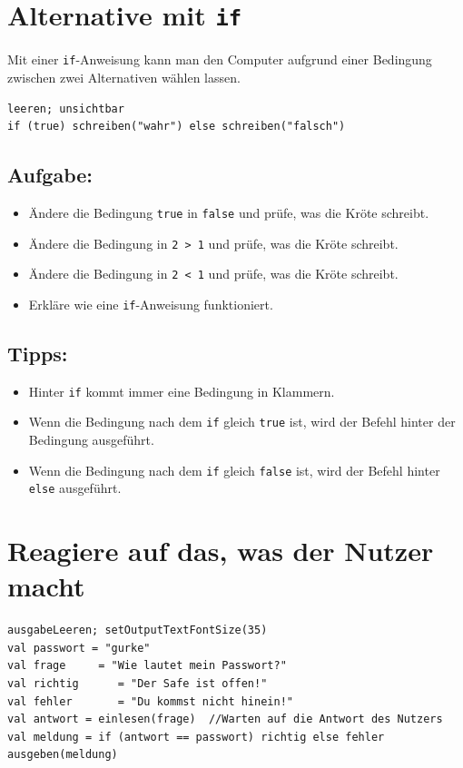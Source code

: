 \chapter{Alternative mit \lstinline{if}}Mit einer \lstinline{if}-Anweisung kann man den Computer aufgrund einer Bedingung zwischen zwei Alternativen wählen lassen.

\begin{lstlisting}[basicstyle={\ttfamily\fontsize{20}{24}\selectfont},numbers=none]
leeren; unsichtbar
if (true) schreiben("wahr") else schreiben("falsch")
\end{lstlisting}
        
\section*{\color{BrickRed}Aufgabe:}


\begin{itemize}

\item {Ändere die Bedingung \lstinline{true} in \lstinline{false} und prüfe, was die Kröte schreibt.}
\item {Ändere die Bedingung in \lstinline{2 > 1} und prüfe, was die Kröte schreibt.}
\item {Ändere die Bedingung in \lstinline{2 < 1} und prüfe, was die Kröte schreibt.}
\item {Erkläre wie eine \lstinline{if}-Anweisung funktioniert.}

\end{itemize}


\section*{\color{OliveGreen}Tipps:}


\begin{itemize}

\item {Hinter \lstinline{if} kommt immer eine Bedingung in Klammern.}
\item {Wenn die Bedingung nach dem \lstinline{if} gleich \lstinline{true} ist, wird der Befehl hinter der Bedingung ausgeführt.}
\item {Wenn die Bedingung nach dem \lstinline{if} gleich \lstinline{false} ist, wird der Befehl hinter \lstinline{else} ausgeführt.}

\end{itemize}


\chapter{Reagiere auf das, was der Nutzer macht}
\begin{lstlisting}[basicstyle={\ttfamily\fontsize{20}{24}\selectfont},numbers=none]
ausgabeLeeren; setOutputTextFontSize(35)
val passwort = "gurke"
val frage     = "Wie lautet mein Passwort?"
val richtig      = "Der Safe ist offen!"
val fehler       = "Du kommst nicht hinein!"
val antwort = einlesen(frage)  //Warten auf die Antwort des Nutzers
val meldung = if (antwort == passwort) richtig else fehler
ausgeben(meldung)
\end{lstlisting}
        
